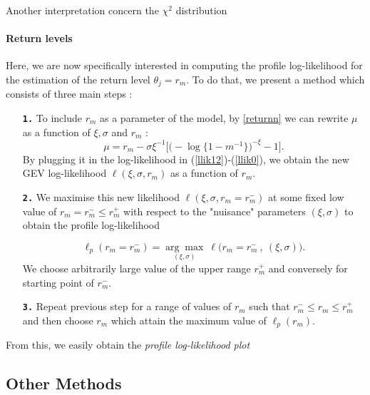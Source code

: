 \documentclass[11pt,a4paper,openany ]{book}
\begin{document}
Another interpretation concern the $\chi^2$ distribution

\paragraph*{Return levels} Here, we are now specifically interested in computing the profile log-likelihood
for the estimation of the return level $\theta_j=r_m$. To do that, we present a method which consists of three main steps :

\begin{enumerate}[label=\textbf{\arabic*})]
	
	\item[\textbf{\texttt{1.}}]  To include $r_m$ as a parameter of the model, by \ref{returnn} we can rewrite $\mu$ as a function of $\xi,\sigma$ and $r_m$ :
	\begin{equation*}
	\mu= r_m-\sigma\xi^{-1}\Big[\Big(-\log\{1-m^{-1}\}\Big)^{-\xi}-1\Big].
	\end{equation*}
	By plugging it in the log-likelihood in (\ref{llik12})-(\ref{llik0}), we obtain the new GEV log-likelihood $\ell(\xi,\sigma,r_m)$ as a function of $r_m$.
	
	\item[\textbf{\texttt{2.}}]   We maximise this new likelihood $\ell (\xi,\sigma,r_m=r^{-}_{m})$ at some fixed low value of $r_m=r^{-}_{m}\leq r^{+}_{m}$ with respect to the "nuisance" parameters $(\xi,\sigma)$ to obtain the profile log-likelihood
	
	\begin{equation*}
	\ell_p(r_m=r^{-}_{m})=\underset{(\xi,\sigma)}{\mathrm{\arg\max}}\ \ell \Big(r_m=r^{-}_{m}\ ,\ (\xi,\sigma)\Big).
	\end{equation*} 
	We choose arbitrarily large value of the upper range $r^{+}_m$ and conversely for starting point of $r^{-}_m$.
	
	\item[\textbf{\texttt{3.}}]  Repeat previous step for a range of values of $r_m$ such that $r^{-}_{m}\leq r_m\leq r^{+}_{m}$ and then choose $r_m$ which attain the maximum value of $\ell_p(r_m)$.
\end{enumerate}

From this, we easily obtain the \emph{profile log-likelihood plot} 


\subsection{Other Methods}\label{sec:gevother}
\end{document}
